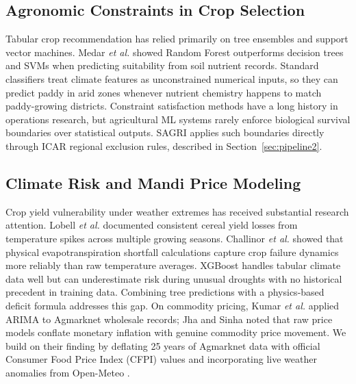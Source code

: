 \documentclass[conference]{IEEEtran}
\begin{document}
\subsection{Agronomic Constraints in Crop Selection}
Tabular crop recommendation has relied primarily on tree ensembles and support vector machines. Medar \textit{et al.} \cite{ref_medar} showed Random Forest \cite{ref_rf} outperforms decision trees and SVMs \cite{ref_svm} when predicting suitability from soil nutrient records. Standard classifiers treat climate features as unconstrained numerical inputs, so they can predict paddy in arid zones whenever nutrient chemistry happens to match paddy-growing districts. Constraint satisfaction methods \cite{ref_tsang} have a long history in operations research, but agricultural ML systems rarely enforce biological survival boundaries over statistical outputs. SAGRI applies such boundaries directly through ICAR regional exclusion rules, described in Section~\ref{sec:pipeline2}.

\subsection{Climate Risk and Mandi Price Modeling}
Crop yield vulnerability under weather extremes has received substantial research attention. Lobell \textit{et al.} \cite{ref_lobell} documented consistent cereal yield losses from temperature spikes across multiple growing seasons. Challinor \textit{et al.} \cite{ref_challinor} showed that physical evapotranspiration shortfall calculations capture crop failure dynamics more reliably than raw temperature averages. XGBoost \cite{ref_xgboost} handles tabular climate data well but can underestimate risk during unusual droughts with no historical precedent in training data. Combining tree predictions with a physics-based deficit formula addresses this gap. On commodity pricing, Kumar \textit{et al.} \cite{ref_price_arima} applied ARIMA to Agmarknet wholesale records; Jha and Sinha \cite{ref_jha} noted that raw price models conflate monetary inflation with genuine commodity price movement. We build on their finding by deflating 25 years of Agmarknet data with official Consumer Food Price Index (CFPI) values and incorporating live weather anomalies from Open-Meteo \cite{ref_openmeteo}.
\end{document}
